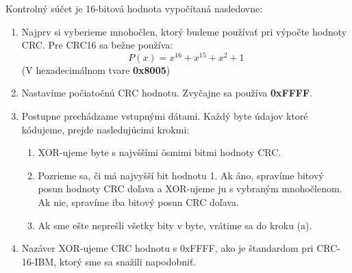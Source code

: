 \documentclass[a4paper,12pt]{article}
\begin{document}
Kontrolný súčet je 16-bitová hodnota vypočítaná nasledovne:
	\begin{enumerate}
		\item Najprv si vyberieme mnohočlen, ktorý budeme používať pri výpočte hodnoty CRC. Pre CRC16 sa bežne používa:
		\[ P(x) = x^{16} + x^{15} + x^2 + 1 \] (V hexadecimálnom tvare \textbf{0x8005})
		
		\item Nastavíme počiatočnú CRC hodnotu. Zvyčajne sa používa \textbf{0xFFFF}.
		
		\item Postupne prechádzame vstupnými dátami. Každý byte údajov ktoré kódujeme, prejde nasledujúcimi krokmi:
		\begin{enumerate}
		    \item XOR-ujeme byte s najvššími ôsmimi bitmi hodnoty CRC.
		    \item Pozrieme sa, či má najvyšší bit hodnotu 1. Ak áno, spravíme bitový posun hodnoty CRC doľava a XOR-ujeme ju s vybraným mnohočlenom. Ak nie, spravíme iba bitový posun CRC doľava. 
		    \item Ak sme ešte neprešli všetky bity v byte, vrátime sa do kroku (a).
		\end{enumerate}

		\item Nazáver XOR-ujeme CRC hodnotu s 0xFFFF, ako je štandardom pri CRC-16-IBM, ktorý sme sa snažili napodobniť.
    \end{enumerate}
\end{document}

